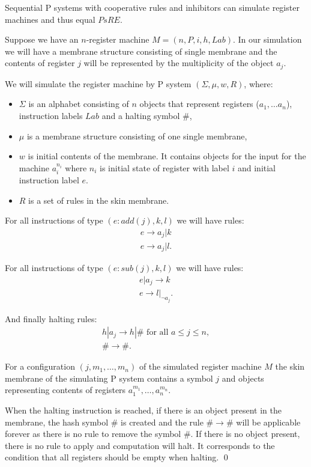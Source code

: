 \begin{veta}
  Sequential P systems with cooperative rules and inhibitors can simulate register machines and thus equal $PsRE$.
\end{veta}


\begin{dokaz}
\label{proof:reg_by_inh}
  Suppose we have an $n$-register machine $M = (n,P,i,h,Lab)$. In our simulation we will have a membrane structure consisting of single membrane and the contents of register $j$ will be represented by the multiplicity of the object $a_j$.

  We will simulate the register machine by P system $(\Sigma, \mu, w, R)$, where:
  \begin{itemize}
    \item $\Sigma$ is an alphabet consisting of $n$ objects that represent registers ($a_1,\dots a_n$), instruction labels $Lab$ and a halting symbol $\#$,
    \item $\mu$ is a membrane structure consisting of one single membrane,
    \item $w$ is initial contents of the membrane. It contains objects for the input for the machine $a_i^{n_i}$ where $n_i$ is initial state of register with label $i$ and initial instruction label $e$.
    \item $R$ is a set of rules in the skin membrane.
  \end{itemize}
    
  For all instructions of type $(e : add(j), k, l)$ we will have rules:
  \begin{align*}
    e \rightarrow a_j|k\\
    e \rightarrow a_j|l.
  \end{align*}

  For all instructions of type $(e : sub(j), k, l)$ we will have rules:
  \begin{align*}
    e|a_j \rightarrow k\\
    e \rightarrow l|_{\neg a_j}.
  \end{align*}

  And finally halting rules:
  \begin{align*}
    h|a_j \rightarrow h|\#\text{~for all~}a\leq j\leq n,\\
    \# \rightarrow \#.
  \end{align*}

  For a configuration $(j, m_1, \dots, m_n)$ of the simulated register machine $M$ the skin membrane of the simulating P system contains a symbol $j$ and objects representing contents of registers $a_1^{m_1}, \dots, a_n^{m_n}$.

  When the halting instruction is reached, if there is an object present in the membrane, the hash symbol $\#$ is created and the rule $\# \rightarrow \#$ will be applicable forever as there is no rule to remove the symbol $\#$. If there is no object present, there is no rule to apply and computation will halt. It corresponds to the condition that all registers should be empty when halting. \qed
\end{dokaz}